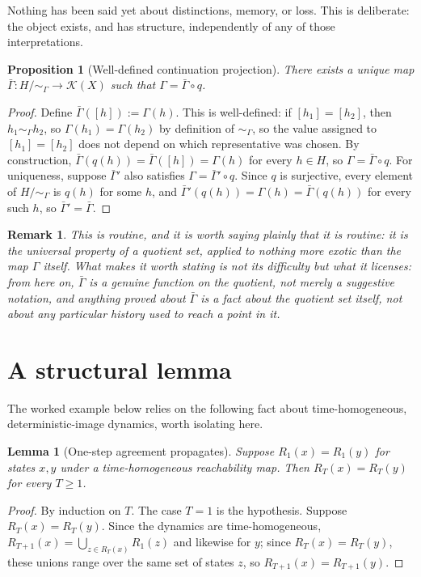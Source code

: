 \documentclass[11pt]{report}
\newtheorem{proposition}{Proposition}[chapter]
\newtheorem{lemma}{Lemma}[chapter]
\newtheorem{remark}{Remark}[chapter]
\begin{document}
Nothing has been said yet about distinctions, memory, or loss. This is
deliberate: the object exists, and has structure, independently of any
of those interpretations.

\begin{proposition}[Well-defined continuation projection]
\label{prop:universal}
There exists a unique map $\bar\Gamma : H/{\sim_\Gamma} \to \mathcal{K}(X)$
such that $\Gamma = \bar\Gamma \circ q$.
\end{proposition}
\begin{proof}
Define $\bar\Gamma([h]) := \Gamma(h)$. This is well-defined: if
$[h_1] = [h_2]$, then $h_1 \sim_\Gamma h_2$, so
$\Gamma(h_1) = \Gamma(h_2)$ by definition of $\sim_\Gamma$, so the
value assigned to $[h_1] = [h_2]$ does not depend on which
representative was chosen. By construction,
$\bar\Gamma(q(h)) = \bar\Gamma([h]) = \Gamma(h)$ for every $h \in H$,
so $\Gamma = \bar\Gamma \circ q$. For uniqueness, suppose
$\bar\Gamma'$ also satisfies $\Gamma = \bar\Gamma' \circ q$. Since $q$
is surjective, every element of $H/{\sim_\Gamma}$ is $q(h)$ for some
$h$, and $\bar\Gamma'(q(h)) = \Gamma(h) = \bar\Gamma(q(h))$ for every
such $h$, so $\bar\Gamma' = \bar\Gamma$.
\end{proof}

\begin{remark}
This is routine, and it is worth saying plainly that it is routine:
it is the universal property of a quotient set, applied to nothing
more exotic than the map $\Gamma$ itself. What makes it worth stating
is not its difficulty but what it licenses: from here on,
$\bar\Gamma$ is a genuine function on the quotient, not merely a
suggestive notation, and anything proved about $\bar\Gamma$ is a fact
about the quotient set itself, not about any particular history used
to reach a point in it.
\end{remark}

\section*{A structural lemma}

The worked example below relies on the following fact about
time-homogeneous, deterministic-image dynamics, worth isolating here.

\begin{lemma}[One-step agreement propagates]
\label{lem:propagate}
Suppose $R_1(x) = R_1(y)$ for states $x, y$ under a time-homogeneous
reachability map. Then $R_T(x) = R_T(y)$ for every $T \geq 1$.
\end{lemma}
\begin{proof}
By induction on $T$. The case $T=1$ is the hypothesis. Suppose
$R_T(x) = R_T(y)$. Since the dynamics are time-homogeneous,
$R_{T+1}(x) = \bigcup_{z \in R_T(x)} R_1(z)$ and likewise for $y$; since
$R_T(x) = R_T(y)$, these unions range over the same set of states $z$,
so $R_{T+1}(x) = R_{T+1}(y)$.
\end{proof}
\end{document}
